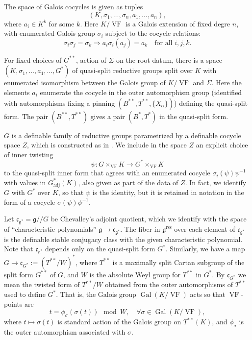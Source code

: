 \documentclass[12pt]{amsart}
\newcommand{\op}[1]{\operatorname{#1}}
\def\VF{{\op{VF}}}
\newcommand{\fg}{\mathfrak{g}}
\newcommand{\fc}{\mathfrak{c}}
\newcommand{\reg}{\mathrm{rss}}
\theoremstyle{plain}
\theoremstyle{definition}
\begin{document}
The space of Galois cocycles is given as tuples
\[
(K,\sigma_1,\ldots,\sigma_n,a_1,\ldots,a_n),
\]
where $a_i \in K^k$ for some $k$.  Here $K/\VF$ is a Galois extension of
fixed degre $n$, with enumerated Galois group $\sigma_i$ subject to
the cocycle relations:
\[
\sigma_i \sigma_j 
  = \sigma_k \Longrightarrow a_i \sigma_i(a_j) 
  = a_k\quad\text{for all } i,j,k.
\]

For fixed choices of $G^{**}$, action of $\Sigma$ on the root datum,
there is a space $(K,\sigma_1,\ldots,a_1,\ldots,G^*)$ of
quasi-split reductive groups split over $K$ with enumerated
isomorphism between the Galois group of $K/\VF$ and $\Sigma$.  Here
the elements $a_i$ enumerate the cocycle in the outer
automorphism group (identified with automorphisms fixing a pinning
$(B^{**},T^{**},\{X_\alpha\})$) defining the quasi-split form.  The
pair $(B^{**},T^{**})$ gives a pair $(B^*,T^*)$ in the quasi-split
form.

$G$ is a definable family of reductive groups parametrized by a
definable cocycle space $Z$, which is constructed as in \cite{CGH}.
We include in the space $Z$ an explicit choice of inner twisting
\[
\psi:G
\times_\VF K \to G^*\times_\VF K
\] to the quasi-split inner form that agrees with an enumerated
cocycle $\sigma_i(\psi) \psi^{-1}$ with values in $G^*_{\text{adj}}(K)$, also
given as part of the data of $Z$.  In fact, we identify $G$ with $G^*$
over $K$, so that $\psi$ is the identity, but it is retained in
notation in the form of a cocycle $\sigma(\psi)\psi^{-1}$.  

Let $\fc_{\fg^{*}} = \fg/\!/G$ be Chevalley's adjoint quotient, which
we identify with the space of ``characteristic polynomials'' $\fg\to
\fc_{\fg^{*}}$.  The fiber in $\fg^\reg$ over each element of
$\fc_{\fg^{*}}$ is the definable stable conjugacy class with the given
characteristic polynomial.  Note that $\fc_{\fg^{*}}$ depends only on
the quasi-split form $G^*$. Similarly, we have a map $G\to \fc_{G^*}:=
(T^{**}/W)^*$, where $T^{**}$ is a maximally split Cartan subgroup of
the split form $G^{**}$ of $G$, and $W$ is the absolute Weyl group for
$T^{**}$ in $G^*$.  By $\fc_{G^*}$ we mean the twisted form of
$T^{**}/W$ obtained from the outer automorphisms of $T^{**}$ used to
define $G^*$.  That is, the Galois group $\op{Gal}(K/\VF)$ acts so
that $\VF$-points are
\[
t =  \phi_\sigma(\sigma(t))\mod W, \quad\forall \sigma\in\op{Gal}(K/\VF),
\]
where $t\mapsto \sigma(t)$ is standard action of the Galois
group on $T^{**}(K)$, and $\phi_\sigma$ is the outer automorphism
associated with $\sigma$.
\end{document}
